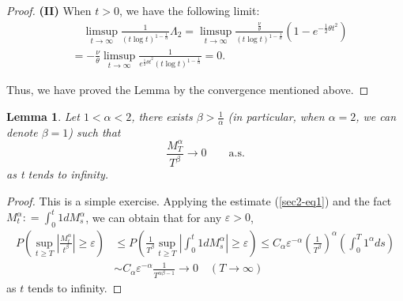 \documentclass[11pt]{amsart}
\theoremstyle{plain}
\newtheorem{lemma}{Lemma}[section]
\numberwithin{equation}{section}
\begin{document}
\begin{proof}
\textbf{(II)} When $t>0$, we have the following limit:
\begin{equation*}
\begin{aligned}
&\quad\limsup_{t\rightarrow \infty}\frac{1}{(t\log t)^{1-\frac{1}{\alpha}}}\Lambda_2 =\limsup_{t\rightarrow \infty}\frac{\frac{\nu}{\theta}}{(t\log t)^{1-\frac{1}{\alpha}}}\left(1-e^{-\frac{1}{2}\theta t^2}\right)\\
&=-\frac{\nu}{\theta}\limsup_{t\rightarrow\infty}\frac{1}{e^{\frac{1}{2}\theta t^2}(t\log t)^{1-\frac{1}{\alpha}}}=0.
\end{aligned}
\end{equation*}

Thus, we have proved the Lemma by the convergence mentioned above.
\end{proof}

\begin{lemma}
Let $1<\alpha<2$, there exists $\beta>\frac{1}{\alpha}$ (in particular, when $\alpha=2$, we can denote $\beta=1$) such that
\begin{equation}\label{sec3-eq15}
\frac{M_T^\alpha}{T^\beta}\longrightarrow 0\qquad\text{a.s.}
\end{equation}
as t tends to infinity.
\end{lemma}

\begin{proof}
This is a simple exercise. Applying the estimate (\ref{sec2-eq1}) and the fact $M_t^\alpha : = \int_0^t 1dM_s^\alpha$, we can obtain that for any $\varepsilon>0$,
\begin{equation*}
\begin{aligned}
P\left(\sup_{t\geq T}\left|\frac{M_t^\alpha}{t^\beta}\right|\geq \varepsilon\right)&\leq P\left(\frac{1}{T^\beta}\sup_{t\geq T}\left|\int_0^t 1dM_s^\alpha\right|\geq \varepsilon\right) \leq C_\alpha\varepsilon^{-\alpha}\left(\frac{1}{T^\beta}\right)^\alpha\left(\int_0^T 1^\alpha ds\right)\\
&\sim C_{\alpha}\varepsilon^{-\alpha}\frac{1}{T^{\alpha\beta-1}}\longrightarrow 0\quad(T\rightarrow\infty)
\end{aligned}
\end{equation*}
as $t$ tends to infinity.
\end{proof}
\end{document}
